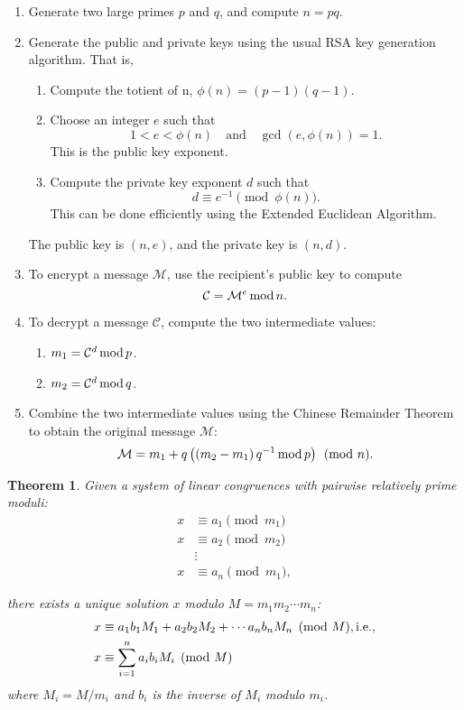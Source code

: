 \documentclass[12pt,openany]{book}
\newtheorem{theorem}{Theorem}[chapter]
\theoremstyle{definition}
\newcommand{\inv}[1]{#1^{-1}}
\newcommand{\ie}{\textnormal{i.e.}}
\newcommand{\of}[1]{\left( #1 \right)}
\renewcommand{\mod}{\operatorname{\textnormal{mod}}}
\begin{document}
	\begin{tcolorbox}[colback=white!10!white,colframe=blue!50!black,title=RSA-CRT Algorithm]
		\begin{enumerate}
			\item Generate two large primes $p$ and $q$, and compute $n = pq$.
			\item Generate the public and private keys using the usual RSA key generation algorithm. That is, \begin{enumerate}
				\item Compute the totient of n, $\phi(n) = (p - 1)(q - 1)$.
				\item Choose an integer $e$ such that \[
				1 < e < \phi(n)\quad \text{and}\quad \gcd(e, \phi(n)) = 1.
				\] This is the public key exponent.
				\item Compute the private key exponent $d$ such that \[
				d\equiv\inv{e} \pmod{\phi(n)}.
				\] This can be done efficiently using the Extended Euclidean Algorithm.
			\end{enumerate}
			The public key is $(n, e)$, and the private key is $(n, d)$.
			\item To encrypt a message $\mathcal{M}$, use the recipient's public key to compute \[
			\mathcal{C} = \mathcal{M}^e \mod{n}.
			\]
			\item To decrypt a message $\mathcal{C}$, compute the two intermediate values: \begin{enumerate}
				\item $m_1 = \mathcal{C}^d \mod p$.
				\item $m_2 = \mathcal{C}^d \mod q$.
			\end{enumerate}
			\item Combine the two intermediate values using the Chinese Remainder Theorem to obtain the original message $\mathcal{M}$: \[
			\mathcal{M} = m_1+q\of{\of{m_2-m_1}\inv{q}\mod p}\pmod{n}.
			\]
		\end{enumerate}
	\end{tcolorbox}
	
	\begin{tcolorbox}[title=Chinese Remainder Theorem]
		\begin{theorem}
			Given a system of linear congruences with pairwise relatively prime moduli:
			\begin{align*}
			x&\equiv a_1 \pmod{m_1}\\
			x&\equiv a_2 \pmod{m_2}\\
			&\vdots \\
			x&\equiv a_n \pmod{m_1},
			\end{align*}
			
			there exists a unique solution $x$ modulo $M = m_1m_2\cdots m_n$:
			\begin{align*}
			x&\equiv a_1b_1M_1+a_2b_2M_2+\cdots a_nb_nM_n\pmod{M}, \ie,\\ x&\equiv\sum_{i=1}^{n}a_ib_iM_i\pmod{M}
			\end{align*}\[
			\] where $M_i=M/m_i$ and $b_i$ is the inverse of $M_i$ modulo $m_i$.
		\end{theorem}
	\end{tcolorbox}
	
\end{document}
